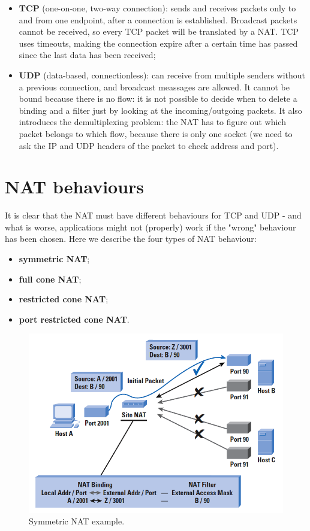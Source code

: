 \begin{itemize}
    \item \textbf{TCP} (one-on-one, two-way connection): sends and receives packets only to and from one endpoint, after a connection is established. Broadcast packets cannot be received, so every TCP packet will be translated by a NAT. TCP uses timeouts, making the connection expire after a certain time has passed since the last data has been received;
    \item \textbf{UDP} (data-based, connectionless): can receive from multiple senders without a previous connection, and broadcast meassages are allowed. It cannot be bound because there is no flow: it is not possible to decide when to delete a binding and a filter just by looking at the incoming/outgoing packets. It also introduces the demultiplexing problem: the NAT has to figure out which packet belongs to which flow, because there is only one socket (we need to ask the IP and UDP headers of the packet to check address and port).
\end{itemize}


\section{NAT behaviours}
It is clear that the NAT must have different behaviours for TCP and UDP  - and what is worse, applications might not (properly) work if the "wrong" behaviour has been chosen. Here we describe the four types of NAT behaviour:

\begin{itemize}
    \item \textbf{symmetric NAT};
    \item \textbf{full cone NAT};
    \item \textbf{restricted cone NAT};
    \item \textbf{port restricted cone NAT}.
\end{itemize}

\begin{figure}[h]
    \centering
    \includegraphics[scale=0.6]{img/symm_nat.png}
    \decoRule
    \caption{Symmetric NAT example.}
    \label{fig:symm_nat}
\end{figure}

